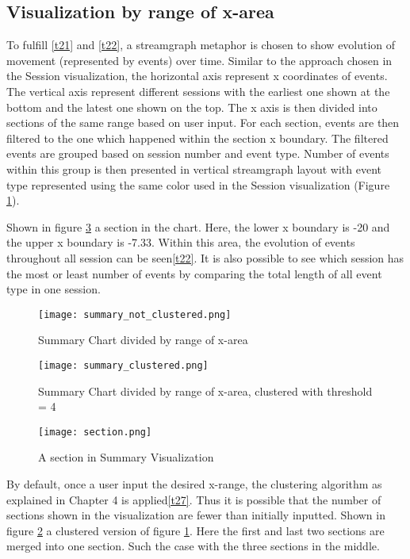 \subsection{Visualization by range of x-area}
To fulfill \ref{t21} and \ref{t22}, a streamgraph metaphor is chosen to show evolution of movement (represented by events) over time. Similar to the approach chosen in the Session visualization, the horizontal axis represent x coordinates of events. The vertical axis represent different sessions with the earliest one shown at the bottom and the latest one shown on the top. The x axis is then divided into sections of the same range based on user input. For each section, events are then filtered to the one which happened within the section x boundary. The filtered events are grouped based on session number and event type. Number of events within this group is then presented in vertical streamgraph layout with event type represented using the same color used in the Session visualization (Figure  \ref{fig:type1_not_clustered}). 

Shown in figure \ref{fig:type1_section} a section in the chart. Here, the lower x boundary is -20 and the upper x boundary is -7.33. Within this area, the evolution of events throughout all session can be seen\ref{t22}. It is also possible to see which session has the most or least number of events by comparing the total length of all event type in one session. 

\begin{figure}
\centering
\texttt{[image: summary\_not\_clustered.png]}
\caption{Summary Chart divided by range of x-area}
\label{fig:type1_not_clustered}
\end{figure}

\begin{figure}
\centering
\texttt{[image: summary\_clustered.png]}
\caption{Summary Chart divided by range of x-area, clustered with threshold = 4}
\label{fig:type1_clustered}
\end{figure}

\begin{figure}
\centering
\texttt{[image: section.png]}
\caption{A section in Summary Visualization}
\label{fig:type1_section}
\end{figure}

By default, once a user input the desired x-range, the clustering algorithm as explained in Chapter 4 is applied\ref{t27}. Thus it is possible that the number of sections shown in the visualization are fewer than initially inputted. Shown in figure \ref{fig:type1_clustered} a clustered version of figure \ref{fig:type1_not_clustered}. Here the first and last two sections are merged into one section. Such the case with the three sections in the middle.

